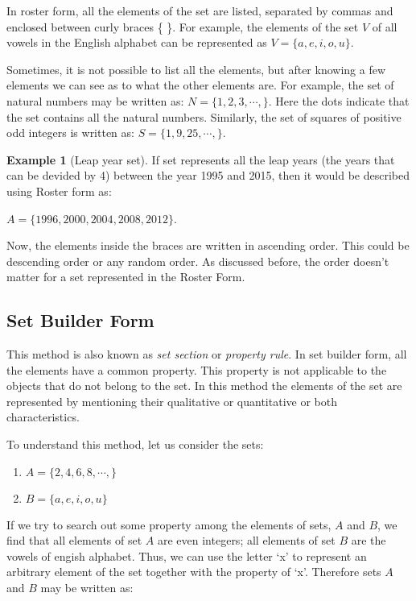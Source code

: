 \documentclass[
]{book}
\theoremstyle{definition}
\theoremstyle{definition}
\newtheorem{example}{Example}[chapter]
\theoremstyle{definition}
\theoremstyle{definition}
\theoremstyle{remark}
\begin{document}
In roster form, all the elements of the set are listed, separated by commas and enclosed between curly braces \{ \}. For example, the elements of the set \(V\) of all vowels in the English alphabet can be represented as \(V=\{a,e,i,o,u\}\).

Sometimes, it is not possible to list all the elements, but after knowing a few elements we can see as to what the other elements are. For example, the set of natural numbers may be written as: \(N=\{1,2,3,\cdots ,\}\). Here the dots indicate that the set contains all the natural numbers. Similarly, the set of squares of positive odd integers is written as: \(S=\{1,9,25,\cdots ,\}\).

\begin{example}[Leap year set]
\protect\hypertarget{exm:ex2}{}\label{exm:ex2}If set represents all the leap years (the years that can be devided by 4) between the year 1995 and 2015, then it would be described using Roster form as:

\(A =\{1996,2000,2004,2008,2012\}\).

Now, the elements inside the braces are written in ascending order. This could be descending order or any random order. As discussed before, the order doesn't matter for a set represented in the Roster Form.
\end{example}

\hypertarget{set-builder-form}{%
\subsection{Set Builder Form}\label{set-builder-form}}

This method is also known as \emph{set section} or \emph{property rule}. In set builder form, all the elements have a common property. This property is not applicable to the objects that do not belong to the set. In this method the elements of the set are represented by mentioning their qualitative or quantitative or both characteristics.

To understand this method, let us consider the sets:

\begin{enumerate}
\def\labelenumi{\arabic{enumi}.}
\item
  \(A=\{2,4,6,8,\cdots ,\}\)
\item
  \(B=\{a,e,i,o,u\}\)
\end{enumerate}

If we try to search out some property among the elements of sets, \(A\) and \(B\), we find that all elements of set \(A\) are even integers; all elements of set \(B\) are the vowels of engish alphabet. Thus, we can use the letter `x' to represent an arbitrary element of the set together with the property of `x'. Therefore sets \(A\) and \(B\) may be written as:
\end{document}
